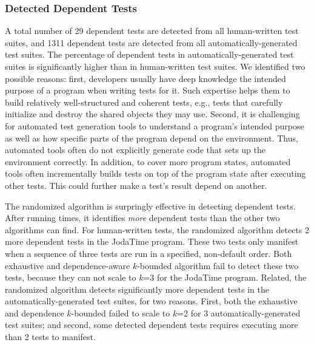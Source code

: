 \subsubsection{Detected Dependent Tests}
\label{sec:detectedtests}

A total number of 29 dependent tests are detected
from all human-written test suites, and 1311
dependent tests are detected from all automatically-generated
test suites. The percentage of dependent tests
in automatically-generated test suites is significantly
higher than in human-written test suites. We identified
two possible reasons: first, developers usually have deep
knowledge the intended purpose of a program when writing tests
for it. Such expertise helps them to build relatively well-structured and coherent
tests, e.g., tests that carefully initialize and destroy the
shared objects they may use. Second, 
 it is challenging for automated test generation tools to understand
 a program's intended purpose as well as how
specific parts of the program depend on the environment.
Thus, automated tools often do not explicitly generate code that sets up the
environment correctly.  In addition, to cover more
program states, automated tools often incrementally
builds tests on top of the program state after executing
other tests. This could further make a test's result depend on another.





The randomized algorithm is surpringly effective in
detecting dependent tests. After running \trialnum times,
it identifies \textit{more} dependent tests than the other
two algorithms can find. For human-written
tests, the randomized algorithm detects 2 more dependent
tests in the JodaTime program. These two tests only
manifest when a sequence of three tests are run in a specified,
non-default order. Both exhaustive and dependence-aware $k$-bounded
algorithm fail to detect these two tests, because
they can not scale to $k$=3 for the
JodaTime program. Related, the randomized algorithm
detects significantly more dependent
tests in the automatically-generated test suites, for
two reasons. First,
both the exhaustive and dependence $k$-bounded
failed to scale to $k$=2 for 3 automatically-generated test suites;
and second, some detected dependent tests requires executing more than 2 tests
to manifest.


